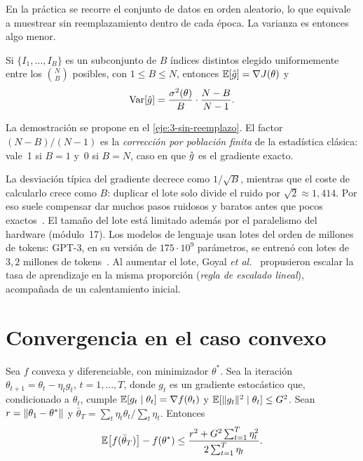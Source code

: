 En la práctica se recorre el conjunto de datos en orden aleatorio, lo que equivale a muestrear sin reemplazamiento dentro de cada época. La varianza es entonces algo menor.

\begin{proposicion}\label{prop:sin-reemplazo}
Si $\{I_1,\dots,I_B\}$ es un subconjunto de $B$ índices distintos elegido uniformemente entre los $\binom{N}{B}$ posibles, con $1\le B\le N$, entonces $\mathbb{E}[\hat g]=\nabla J(\theta)$ y
\[
\operatorname{Var}[\hat g]=\frac{\sigma^{2}(\theta)}{B}\cdot\frac{N-B}{N-1}.
\]
\end{proposicion}

La demostración se propone en el \cref{eje:3-sin-reemplazo}. El factor $(N-B)/(N-1)$ es la \emph{corrección por población finita} de la estadística clásica: vale~1 si $B=1$ y~0 si $B=N$, caso en que $\hat g$ es el gradiente exacto.

\addtocounter{definicion}{1}%

\begin{observacion}
La desviación típica del gradiente decrece como $1/\sqrt{B}$, mientras que el coste de calcularlo crece como $B$: duplicar el lote solo divide el ruido por $\sqrt2\approx 1{,}414$. Por eso suele compensar dar muchos pasos ruidosos y baratos antes que pocos exactos~\cite[§8.1.3]{gbc}. El tamaño del lote está limitado además por el paralelismo del hardware (módulo~17). Los modelos de lenguaje usan lotes del orden de millones de tokens: GPT-3, en su versión de $175\cdot 10^{9}$ parámetros, se entrenó con lotes de $3{,}2$ millones de tokens~\cite[tabla~2.1]{gpt3}. Al aumentar el lote, Goyal \emph{et al.}~\cite{goyal} propusieron escalar la tasa de aprendizaje en la misma proporción (\emph{regla de escalado lineal}), acompañada de un calentamiento inicial.
\end{observacion}

\addtocounter{figure}{1}%

\section{Convergencia en el caso convexo}

\begin{teorema}\label{teo:sgd-convexo}
Sea $f$ convexa y diferenciable, con minimizador $\theta^{\ast}$. Sea la iteración $\theta_{t+1}=\theta_t-\eta_t g_t$, $t=1,\dots,T$, donde $g_t$ es un gradiente estocástico que, condicionado a $\theta_t$, cumple $\mathbb{E}[g_t\mid\theta_t]=\nabla f(\theta_t)$ y $\mathbb{E}[\lVert g_t\rVert^{2}\mid\theta_t]\le G^{2}$. Sean $r=\lVert\theta_1-\theta^{\ast}\rVert$ y $\bar\theta_T=\sum_t\eta_t\theta_t/\sum_t\eta_t$. Entonces
\[
\mathbb{E}\bigl[f(\bar\theta_T)\bigr]-f(\theta^{\ast})\le\frac{r^{2}+G^{2}\sum_{t=1}^{T}\eta_t^{2}}{2\sum_{t=1}^{T}\eta_t}.
\]
\end{teorema}

